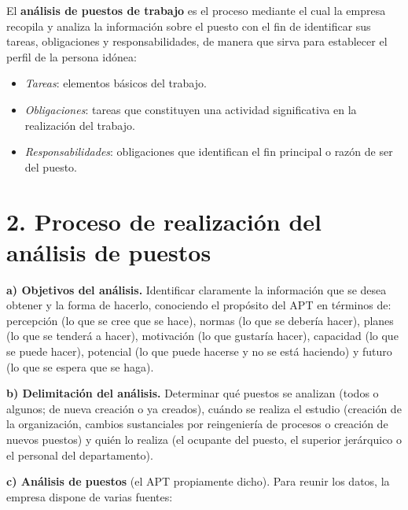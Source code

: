 \documentclass[12pt]{book} %
\providecommand{\tightlist}{%
  \setlength{\itemsep}{0pt}\setlength{\parskip}{0pt}}
\begin{document}
El \textbf{análisis de puestos de trabajo} es el proceso mediante el
cual la empresa recopila y analiza la información sobre el puesto con el
fin de identificar sus tareas, obligaciones y responsabilidades, de
manera que sirva para establecer el perfil de la persona idónea:

\begin{itemize}
\tightlist
\item
  \emph{Tareas}: elementos básicos del trabajo.
\item
  \emph{Obligaciones}: tareas que constituyen una actividad
  significativa en la realización del trabajo.
\item
  \emph{Responsabilidades}: obligaciones que identifican el fin
  principal o razón de ser del puesto.
\end{itemize}

\hypertarget{proceso-de-realizaciuxf3n-del-anuxe1lisis-de-puestos}{%
\section{2. Proceso de realización del análisis de
puestos}\label{proceso-de-realizaciuxf3n-del-anuxe1lisis-de-puestos}}

\textbf{a) Objetivos del análisis.} Identificar claramente la
información que se desea obtener y la forma de hacerlo, conociendo el
propósito del APT en términos de: percepción (lo que se cree que se
hace), normas (lo que se debería hacer), planes (lo que se tenderá a
hacer), motivación (lo que gustaría hacer), capacidad (lo que se puede
hacer), potencial (lo que puede hacerse y no se está haciendo) y futuro
(lo que se espera que se haga).

\textbf{b) Delimitación del análisis.} Determinar qué puestos se
analizan (todos o algunos; de nueva creación o ya creados), cuándo se
realiza el estudio (creación de la organización, cambios sustanciales
por reingeniería de procesos o creación de nuevos puestos) y quién lo
realiza (el ocupante del puesto, el superior jerárquico o el personal
del departamento).

\textbf{c) Análisis de puestos} (el APT propiamente dicho). Para reunir
los datos, la empresa dispone de varias fuentes:
\end{document}
